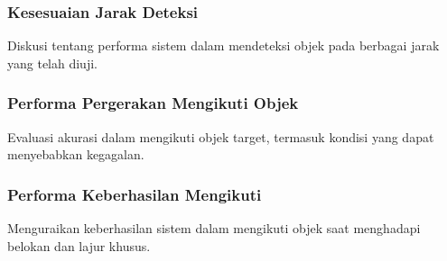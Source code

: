 \subsubsection{Kesesuaian Jarak Deteksi}
\label{subsec:kesesuaianjarak}

Diskusi tentang performa sistem dalam mendeteksi objek pada berbagai jarak yang telah diuji.

\subsubsection{Performa Pergerakan Mengikuti Objek}
\label{subsec:akurasiikutiobjek}

Evaluasi akurasi dalam mengikuti objek target, termasuk kondisi yang dapat menyebabkan kegagalan.

\subsubsection{Performa Keberhasilan Mengikuti}
\label{subsec:keberhasilanmengikuti}

Menguraikan keberhasilan sistem dalam mengikuti objek saat menghadapi belokan dan lajur khusus.